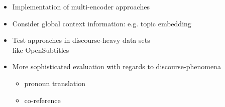 \documentclass[11pt, a4paper, landscape]{article}
\begin{document}
\NewPage
{}
\vfill
\begin{itemize}
	\item Implementation of multi-encoder approaches\\ \cite{bawden_2018,voita_2018}
	\item Consider global context information: e.g. topic embedding
	\item Test approaches in discourse-heavy data sets \\ like OpenSubtitles \cite{lison_2016}
	\item More sophisticated evaluation with regards to discourse-phenomena 
	\begin{itemize}
		\item pronoun translation
		\item co-reference
	\end{itemize}
\end{itemize}
\vfill


\FinalPage


\NewPage


\end{document}

